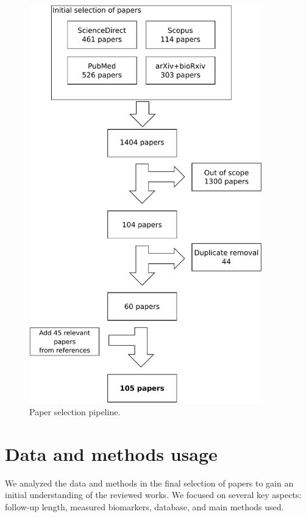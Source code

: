 \begin{figure}[!htbp]
  \centering
  \includegraphics[width=0.9\textwidth,height=0.9\textheight,keepaspectratio]{figures/review/Fig1.pdf}
  \caption{Paper selection pipeline.}
  \label{fig:search}
\end{figure}

\section{Data and methods usage}
\label{sec:longdata}

We analyzed the data and methods in the final selection of papers to gain an initial understanding of the reviewed works. We focused on several key aspects: follow-up length, measured biomarkers, database, and main methods used. \\

